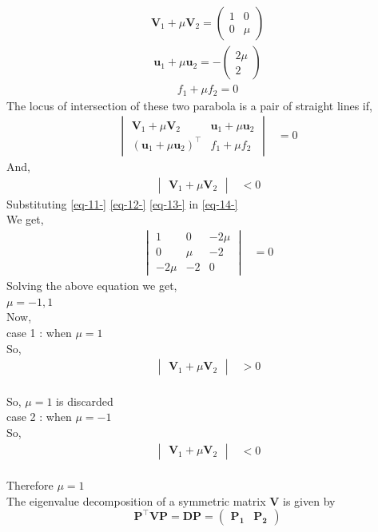 \documentclass[journal,12pt,twocolumn]{IEEEtran}
\newcommand{\myvec}[1]{\ensuremath{\begin{pmatrix}#1\end{pmatrix}}}
\let\vec\mathbf
\let\vec\mathbf
\newcommand{\mydet}[1]{\ensuremath{\begin{vmatrix}#1\end{vmatrix}}}
\providecommand{\brak}[1]{\ensuremath{\left(#1\right)}}
\begin{document}
\begin{align}
\vec{V}_1+\mu\vec{V}_2= \myvec{
1 & 0\\
0 & \mu
}
\label{eq-11-}  
\end{align}
\begin{align}
\vec{u}_1+\mu\vec{u}_2= -\myvec{
2 \mu\\
2
}
\label{eq-12-}  
\end{align}
\begin{align}
f_1+\mu f_2= 0
\label{eq-13-}  
\end{align}
The locus of intersection of these two parabola is a pair of straight lines  if, \\ 
\begin{align}
\mydet{\vec{V}_1 + \mu\vec{V}_2 & \vec{u}_1+\mu \vec{u}_2\\ \brak{\vec{u}_1+\mu \vec{u}_2}^{\top} & f_1 + \mu f_2} &= 0
\label{eq-14-}  
\end{align}
And,\\
\begin{align}
\mydet{\vec{V}_1 + \mu\vec{V}_2} & < 0
\end{align}
Substituting \eqref{eq-11-} \eqref{eq-12-} \eqref{eq-13-} in \eqref{eq-14-}\\
We get,\\ 
\begin{align}
\mydet{1& 0 & -2 \mu\\ 
0 & \mu & -2 \\
-2 \mu & -2 & 0
} &= 0
\end{align}
Solving the above equation we get,\\ 
$\mu = -1 ,1$
\\
Now,\\
case 1 : when $\mu = 1$\\
So,\\
\begin{align}
\mydet{\vec{V}_1 + \mu\vec{V}_2} & > 0
\end{align}
\\
So, $\mu =1 $ is discarded\\
case 2 : when $\mu = -1$\\
So,\\
\begin{align}
\mydet{\vec{V}_1 + \mu\vec{V}_2} & < 0
\end{align}
\\
Therefore $\mu = 1$\\
 The eigenvalue decomposition of a symmetric matrix $\vec{V}$ is given by
  \begin{equation}
  \vec{P}^{\top}\vec{V}\vec{P} = \vec{D} 
  \label{eq-20-} 
  \vec{P} = \myvec{\vec{P_1} & \vec{P_2}}                                                    
  \end{equation}
\end{document}
